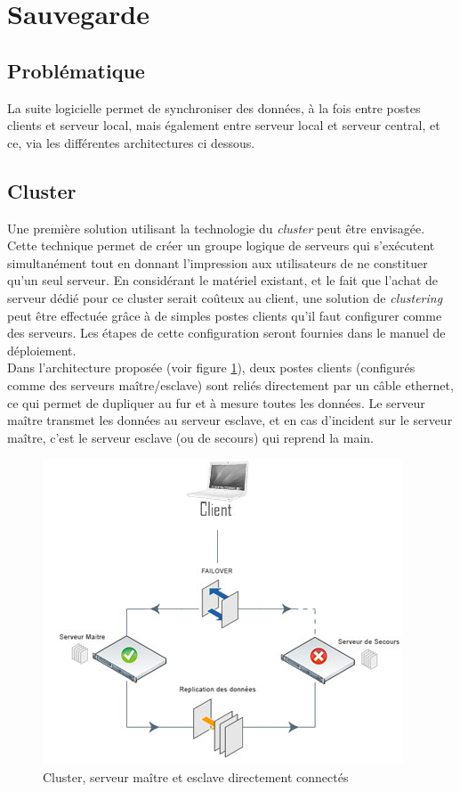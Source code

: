 \section{Sauvegarde}\label{SauvegardeTechnique}

% 

\subsection{Problématique}
La suite logicielle permet de synchroniser des données, à la fois entre postes clients et serveur local, mais également entre serveur local et serveur central, et ce, via les différentes architectures ci dessous.

\subsection{Cluster}
Une première solution utilisant la technologie du \emph{cluster} peut être envisagée. Cette technique permet de créer un groupe logique de serveurs qui s'exécutent simultanément tout en donnant l'impression aux utilisateurs de ne constituer qu'un seul serveur.
En considérant le matériel existant, et le fait que l'achat de serveur dédié pour ce cluster serait coûteux au client, une solution de \emph{clustering} peut être effectuée grâce à de simples postes clients qu'il faut configurer comme des serveurs.
Les étapes de cette configuration seront fournies dans le manuel de déploiement.
\\
Dans l'architecture proposée (voir figure \ref{SchemaCluster}), deux postes clients (configurés comme des serveurs maître/esclave) sont reliés directement par un câble ethernet, ce qui permet de dupliquer au fur et à mesure toutes les données.
Le serveur maître transmet les données au serveur esclave, et en cas d'incident sur le serveur maître, c'est le serveur esclave (ou de secours) qui reprend la main.

\begin{figure}[htbp]
	\centering
	\includegraphics[scale=0.9]{Images/SchemaCluster.png}
	\caption{Cluster, serveur maître et esclave directement connectés}
	\label{SchemaCluster}
\end{figure}

